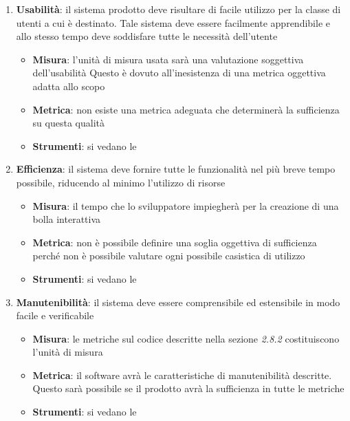{\begin{enumerate}
  \item \textbf{Usabilità}: il sistema prodotto deve risultare di facile
    utilizzo per la classe di utenti a cui è destinato. Tale sistema
    deve essere facilmente apprendibile e allo stesso tempo deve
    soddisfare tutte le necessità dell'utente
    \begin{itemize}
    \item \textbf{Misura}: l'unità di misura usata sarà una valutazione soggettiva dell'usabilità Questo è dovuto all'inesistenza di una metrica oggettiva adatta allo scopo
    \item \textbf{Metrica}:  non esiste una metrica adeguata che determinerà la sufficienza su questa qualità
    \item \textbf{Strumenti}: si vedano le  \emph{\normediprogetto}
    \end{itemize}

  \item \textbf{Efficienza}: il sistema deve fornire tutte le funzionalità nel più breve tempo possibile,
    riducendo al minimo l'utilizzo di risorse
    \begin{itemize}
    \item \textbf{Misura}: il tempo che lo sviluppatore impiegherà per la creazione di una bolla interattiva
    \item \textbf{Metrica}: non è possibile definire una soglia oggettiva di sufficienza perché non è possibile valutare ogni possibile casistica di utilizzo
    \item \textbf{Strumenti}: si vedano le  \emph{\normediprogetto}
    \end{itemize}

  \item \textbf{Manutenibilità}: il sistema deve essere comprensibile ed estensibile in modo facile e verificabile
    \begin{itemize}
    \item \textbf{Misura}: le metriche sul codice descritte nella sezione \emph{2.8.2}
      costituiscono l'unità di misura
    \item \textbf{Metrica}: il software avrà le caratteristiche di manutenibilità descritte. Questo sarà possibile se il prodotto avrà la sufficienza in tutte le metriche
    \item \textbf{Strumenti}: si vedano le  \emph{\normediprogetto}
    \end{itemize}


\end{enumerate}}
